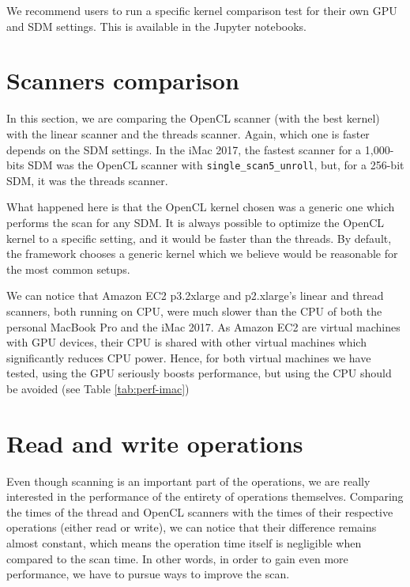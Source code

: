 We recommend users to run a specific kernel comparison test for their own GPU and SDM settings.  This is available in the Jupyter notebooks.


\section{Scanners comparison}

In this section, we are comparing the OpenCL scanner (with the best kernel) with the linear scanner and the threads scanner. Again, which one is faster depends on the SDM settings. In the iMac 2017, the fastest scanner for a 1,000-bits SDM was the OpenCL scanner with \lstinline{single_scan5_unroll}, but, for a 256-bit SDM, it was the threads scanner.

What happened here is that the OpenCL kernel chosen was a generic one which performs the scan for any SDM. It is always possible to optimize the OpenCL kernel to a specific setting, and it would be faster than the threads. By default, the framework chooses a generic kernel which we believe would be reasonable for the most common setups.

We can notice that Amazon EC2 p3.2xlarge and p2.xlarge's linear and thread scanners, both running on CPU, were much slower than the CPU of both the personal MacBook Pro and the iMac 2017. As Amazon EC2 are virtual machines with GPU devices, their CPU is shared with other virtual machines which significantly reduces CPU power. Hence, for both virtual machines we have tested, using the GPU seriously boosts performance, but using the CPU should be avoided (see Table \ref{tab:perf-imac})

\section{Read and write operations}

Even though scanning is an important part of the operations, we are really interested in the performance of the entirety of operations themselves. Comparing the times of the thread and OpenCL scanners with the times of their respective operations (either read or write), we can notice that their difference remains almost constant, which means the operation time itself is negligible when compared to the scan time. In other words, in order to gain even more performance, we have to pursue ways to improve the scan.


